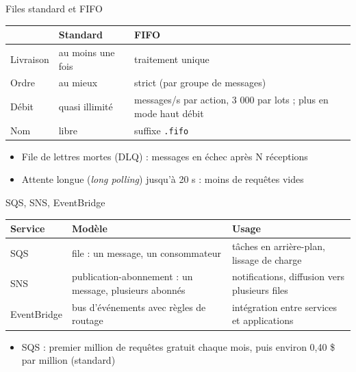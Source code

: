 \begin{frame}{Files standard et FIFO}
  \renewcommand{\arraystretch}{1.4}
  \begin{tabularx}{\textwidth}{@{}>{\raggedright\arraybackslash}p{3.2cm}>{\raggedright\arraybackslash}X>{\raggedright\arraybackslash}X@{}}
    \toprule
    & \textbf{Standard} & \textbf{FIFO} \\ \midrule
    Livraison & au moins une fois & traitement unique \\
    Ordre & au mieux & strict (par groupe de messages) \\
    Débit & quasi illimité & 300 messages/s par action, 3 000 par lots ; plus en mode haut débit \\
    Nom & libre & suffixe \texttt{.fifo} \\ \bottomrule
  \end{tabularx}
  \bigskip
  \begin{itemize}
    \item File de lettres mortes (DLQ) : messages en échec après N réceptions
    \item Attente longue (\emph{long polling}) jusqu'à 20 s : moins de requêtes vides
  \end{itemize}
\end{frame}

\begin{frame}{SQS, SNS, EventBridge}
  \renewcommand{\arraystretch}{1.4}
  \begin{tabularx}{\textwidth}{@{}>{\raggedright\arraybackslash}p{3.2cm}>{\raggedright\arraybackslash}X>{\raggedright\arraybackslash}X@{}}
    \toprule
    \textbf{Service} & \textbf{Modèle} & \textbf{Usage} \\ \midrule
    SQS & file : un message, un consommateur & tâches en arrière-plan, lissage de charge \\
    SNS & publication-abonnement : un message, plusieurs abonnés & notifications, diffusion vers plusieurs files \\
    EventBridge & bus d'événements avec règles de routage & intégration entre services et applications \\ \bottomrule
  \end{tabularx}
  \bigskip
  \begin{itemize}
    \item SQS : premier million de requêtes gratuit chaque mois, puis environ 0,40 \$ par million (standard)
  \end{itemize}
\end{frame}



